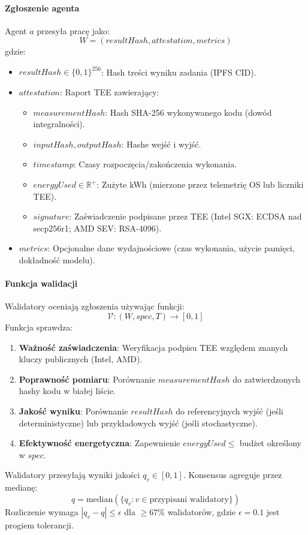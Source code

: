 \documentclass[11pt]{article}
\begin{document}
\paragraph{Zgłoszenie agenta} Agent $a$ przesyła pracę jako:
\begin{equation}
W = (resultHash, attestation, metrics)
\end{equation}
gdzie:
\begin{itemize}[noitemsep]
  \item $resultHash \in \{0,1\}^{256}$: Hash treści wyniku zadania (IPFS CID).
  \item $attestation$: Raport TEE zawierający:
    \begin{itemize}[noitemsep]
      \item $measurementHash$: Hash SHA-256 wykonywanego kodu (dowód integralności).
      \item $inputHash, outputHash$: Hashe wejść i wyjść.
      \item $timestamp$: Czasy rozpoczęcia/zakończenia wykonania.
      \item $energyUsed \in \mathbb{R}^+$: Zużyte kWh (mierzone przez telemetrię OS lub liczniki TEE).
      \item $signature$: Zaświadczenie podpisane przez TEE (Intel SGX: ECDSA nad secp256r1; AMD SEV: RSA-4096).
    \end{itemize}
  \item $metrics$: Opcjonalne dane wydajnościowe (czas wykonania, użycie pamięci, dokładność modelu).
\end{itemize}

\paragraph{Funkcja walidacji} Walidatory oceniają zgłoszenia używając funkcji:
\begin{equation}
\mathcal{V}: (W, spec, T) \rightarrow [0, 1]
\end{equation}
Funkcja sprawdza:
\begin{enumerate}[noitemsep]
  \item \textbf{Ważność zaświadczenia}: Weryfikacja podpisu TEE względem znanych kluczy publicznych (Intel, AMD).
  \item \textbf{Poprawność pomiaru}: Porównanie $measurementHash$ do zatwierdzonych hashy kodu w białej liście.
  \item \textbf{Jakość wyniku}: Porównanie $resultHash$ do referencyjnych wyjść (jeśli deterministyczne) lub przykładowych wyjść (jeśli stochastyczne).
  \item \textbf{Efektywność energetyczna}: Zapewnienie $energyUsed \leq$ budżet określony w $spec$.
\end{enumerate}
Walidatory przesyłają wyniki jakości $q_v \in [0,1]$. Konsensus agreguje przez medianę:
\begin{equation}
q = \text{median}(\{q_v : v \in \text{przypisani walidatory}\})
\end{equation}
Rozliczenie wymaga $|q_v - q| \leq \epsilon$ dla $\geq 67\%$ walidatorów, gdzie $\epsilon = 0.1$ jest progiem tolerancji.
\end{document}
